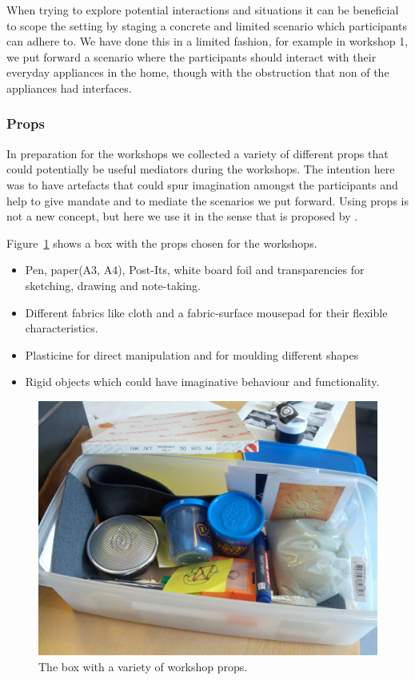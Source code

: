 When trying to explore potential interactions and situations it can be beneficial to scope the setting by staging a concrete and limited scenario which participants can adhere to.
We have done this in a limited fashion, for example in workshop 1, we put forward a scenario where the participants should interact with their everyday appliances in the home, though with the obstruction that non of the appliances had interfaces.

\subsubsection{Props}
\label{ch:workshops:approach:props}

In preparation for the workshops we collected a variety of different props that could potentially be useful mediators during the workshops.
The intention here was to have artefacts that could spur imagination amongst the participants and help to give mandate and to mediate the scenarios we put forward.
Using props is not a new concept, but here we use it in the sense that is proposed by \citet{dindler2007fictional}.

Figure~\ref{ch:workshops:props-box} shows a box with the props chosen for the workshops.

\begin{itemize}
  \item{Pen, paper(A3, A4), Post-Its, white board foil and transparencies for sketching, drawing and note-taking.}
  \item{Different fabrics like cloth and a fabric-surface mousepad for their flexible characteristics.}
  \item{Plasticine for direct manipulation and for moulding different shapes}
  \item{Rigid objects which could have imaginative behaviour and functionality.}
\end{itemize}

\begin{figure}[hb]
  \centering
    \includegraphics[width=.9\textwidth]{workshops/props-box}
    \caption[A box with a variety of workshop props.] %
  {The box with a variety of workshop props.} %
  \label{ch:workshops:props-box}
\end{figure}

